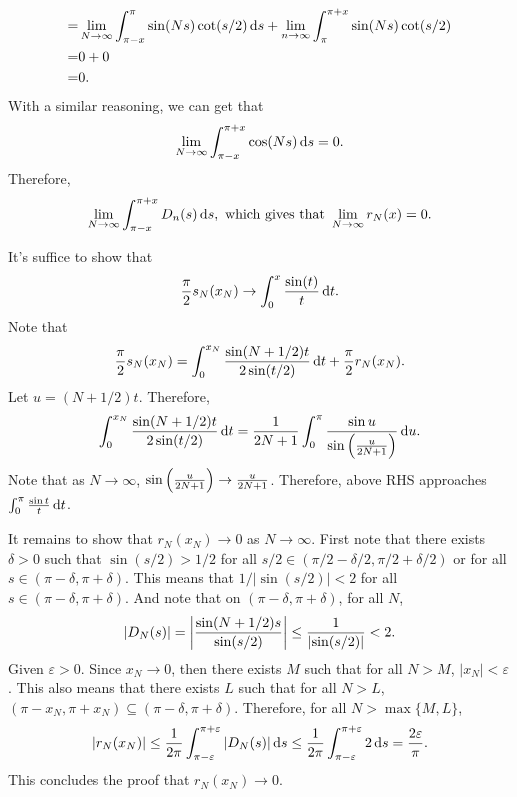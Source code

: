 \documentclass[12pt]{article}
\begin{document}
\begin{fproof}[4(a)]
\begin{align*}
   =&\lim_{N\to \infty} \int_{\pi-x}^{\pi} \sin(Ns) \cot(s/2) \mathop{}\!\mathrm{d} s + \lim_{n\to \infty} \int_{\pi}^{\pi+x} \sin(Ns) \cot(s/2) \\
   =& 0 +0\\
   =& 0.
 \end{align*}
 With a similar reasoning, we can get that
 \begin{align*}
   \lim_{N \to \infty}\int_{\pi - x}^{\pi+x} \cos(Ns) \mathop{}\!\mathrm{d} s = 0.
 \end{align*}
 Therefore,
 \begin{align*}
   \lim_{N\to\infty} \int_{\pi - x}^{\pi+x} D_n(s) \mathop{}\!\mathrm{d} s, \text{ which gives that } \lim_{N \to \infty} r_N(x) = 0.
 \end{align*}
\end{fproof}

\begin{fproof}[4(b)]
 It's suffice to show that 
 \begin{align*}
   \frac{\pi}{2} s_N(x_N) \to \int_{0}^{x} \frac{\sin(t)}{t} \mathop{}\!\mathrm{d} t.
 \end{align*}
 Note that 
 \begin{align*}
   \frac{\pi}{2} s_N(x_N) = \int_{0}^{x_N} \frac{\sin(N+1/2)t}{2 \sin(t/2)} \mathop{}\!\mathrm{d} t + \frac{\pi}{2} r_N(x_N).
 \end{align*}
 Let \(u = (N + 1/2)t\).
 Therefore,
 \begin{align*}
   \int_{0}^{x_N} \frac{\sin(N+1/2)t}{2 \sin(t/2)} \mathop{}\!\mathrm{d} t = \frac{1}{2N + 1} \int_{0}^{\pi} \frac{\sin u}{\sin \left( \frac{u}{2N+1} \right)} \mathop{}\!\mathrm{d} u.
 \end{align*}
 Note that as \(N \to \infty\), \(\sin \left( \frac{u}{2N+1} \right) \to \frac{u}{2N+1}\).
 Therefore, above RHS approaches \(\int_{0}^{\pi} \frac{\sin t}{t} \mathop{}\!\mathrm{d} t\).

 It remains to show that
 \(r_N(x_N) \to 0\) as \(N \to \infty\).
 First note that there exists \(\delta > 0\) such that \(\sin(s/2) > 1/2\) for all \(s/2 \in (\pi/2 - \delta/2, \pi/2 + \delta/2)\) or for all \(s \in (\pi - \delta, \pi + \delta)\).
 This means that \(1/|\sin(s/2)| < 2\) for all \(s \in (\pi - \delta, \pi + \delta)\).
 And note that on \((\pi - \delta, \pi + \delta)\), for all \(N\),
 \begin{align*}
   \left\lvert D_N(s) \right\rvert = \left\lvert \frac{\sin(N+1/2)s}{\sin(s/2)} \right\rvert \leq \frac{1}{\left\lvert \sin(s/2) \right\rvert} < 2.
 \end{align*}
 Given \(\varepsilon > 0\).
 Since \(x_N \to 0\), then there exists \(M\)
 such that for all \(N > M\), \(|x_N| < \varepsilon\). This also means that there exists \(L\) such that  for all \(N > L\), \((\pi-x_N, \pi + x_N) \subseteq (\pi - \delta, \pi + \delta)\).
 Therefore, for all \(N > \max\{M,L\}\),
 \begin{align*}
   \left\lvert r_N(x_N) \right\rvert \leq \frac{1}{2\pi}\int_{\pi-\varepsilon}^{\pi + \varepsilon}\left\lvert D_N(s) \right\rvert \mathop{}\!\mathrm{d} s \leq \frac{1}{2\pi} \int_{\pi - \varepsilon}^{\pi + \varepsilon} 2 \mathop{}\!\mathrm{d} s = \frac{2 \varepsilon}{\pi}.
 \end{align*}
 This concludes the proof that \(r_N(x_N) \to 0\).
\end{fproof}
\end{document}
